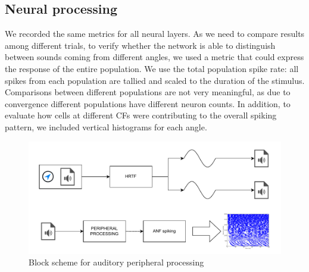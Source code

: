 \documentclass[11pt,a4paper,twocolumn]{article}
\begin{document}
\subsection{Neural processing}
We recorded the same metrics for all neural layers. As we need to compare results among different trials, to verify whether the network is able to distinguish between sounds coming from different angles, we used a metric that could express the response of the entire population. We use the total population spike rate: all spikes from each population are tallied and scaled to the duration of the stimulus. Comparisons between different populations are not very meaningful, as due to convergence different populations have different neuron counts. In addition, to evaluate how cells at different CFs were contributing to the overall spiking pattern, we included vertical histograms for each angle.

\begin{figure}
        \centering
        \includegraphics[width=1\linewidth]{Images/block-HRTF-cochlea-general.pdf}
        \caption{Block scheme for auditory peripheral processing}
        \label{fig:block-periph-general}
\end{figure}
\end{document}
